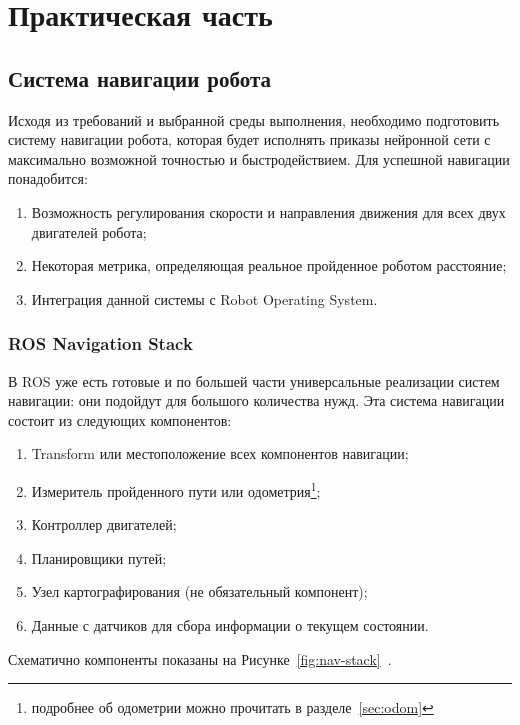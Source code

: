 \chapter{Практическая часть}\label{ch:ch3}

\section{Система навигации робота}\label{sec:ch3/sect1}
Исходя из требований и выбранной среды выполнения, необходимо подготовить систему навигации робота, которая будет исполнять приказы нейронной сети с максимально возможной точностью и быстродействием. Для успешной навигации понадобится:
\begin{enumerate}[beginpenalty=10000] %
  \item Возможность регулирования скорости и направления движения для всех двух двигателей робота;
  \item Некоторая метрика, определяющая реальное пройденное роботом расстояние;
  \item Интеграция данной системы с Robot Operating System.
\end{enumerate}

\subsection{ROS Navigation Stack}
В ROS уже есть готовые и по большей части универсальные реализации систем навигации: они подойдут для большого количества нужд. Эта система навигации состоит из следующих компонентов:

\begin{enumerate}[beginpenalty=10000] %
  \item Transform или местоположение всех компонентов навигации;
  \item Измеритель пройденного пути или одометрия\footnote{подробнее об одометрии можно прочитать в разделе~\cref{sec:odom}};
  \item Контроллер двигателей;
  \item Планировщики путей;
  \item Узел картографирования (не обязательный компонент);
  \item Данные с датчиков для сбора информации о текущем состоянии.
\end{enumerate}

Схематично компоненты показаны на Рисунке~\cref{fig:nav-stack}~\cite{nav-stack}.

